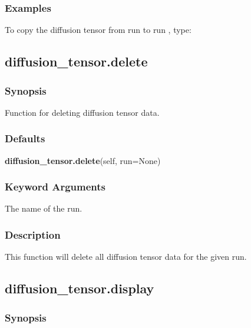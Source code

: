 \subsubsection{Examples}

To copy  the diffusion tensor  from run 
 to run 
, type:




\newpage

\subsection{diffusion\_tensor.delete}


\subsubsection{Synopsis}

Function for deleting diffusion tensor data.

\subsubsection{Defaults}

\textsf{\textbf{diffusion\_tensor.delete}(self, run=None)}


\subsubsection{Keyword Arguments}


  The name of the run.


\subsubsection{Description}

This function will delete  all diffusion tensor  data for the given run.


\newpage

\subsection{diffusion\_tensor.display}


\subsubsection{Synopsis}

